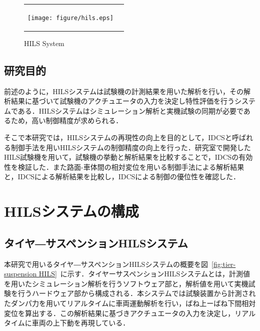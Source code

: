 \documentclass[a4paper,12pt]{article_vdlab_sotsuron}
\begin{document}

\vspace{10mm}
\begin{figure}[h!]
  \begin{tabular}{cc}
    \begin{minipage}{1.0\hsize}
      \begin{center}
	\texttt{[image: figure/hils.eps]}
	\caption{HILS System\cite{toyota_hils}}
	\label{fig:HILS system}
      \end{center}
     \end{minipage}
    \end{tabular}
\end{figure}

\subsection{研究目的}
前述のように，HILSシステムは試験機の計測結果を用いた解析を行い，その解析結果に基づいて試験機のアクチュエータの入力を決定し特性評価を行うシステムである．HILSシステムはシミュレーション解析と実機試験の同期が必要であるため，高い制御精度が求められる．

そこで本研究では，HILSシステムの再現性の向上を目的として，IDCSと呼ばれる制御手法を用いHILSシステムの制御精度の向上を行った．研究室で開発したHILS試験機を用いて，試験機の挙動と解析結果を比較することで，IDCSの有効性を検証した．また路面-車体間の相対変位を用いる制御手法による解析結果と，IDCSによる解析結果を比較し，IDCSによる制御の優位性を確認した．


\newpage
\section{HILSシステムの構成}
\subsection{タイヤ―サスペンションHILSシステム}
本研究で用いるタイヤ―サスペンションHILSシステムの概要を図~\ref{fig:tier-suspension HILS}~に示す．タイヤーサスペンションHILSシステムとは，計測値を用いたシミュレーション解析を行うソフトウェア部と，解析値を用いて実機試験を行うハードウェア部から構成される．本システムでは試験装置から計測されたダンパ力を用いてリアルタイムに車両運動解析を行い，ばね上ーばね下間相対変位を算出する．この解析結果に基づきアクチュエータの入力を決定し，リアルタイムに車両の上下動を再現している．
\end{document}
